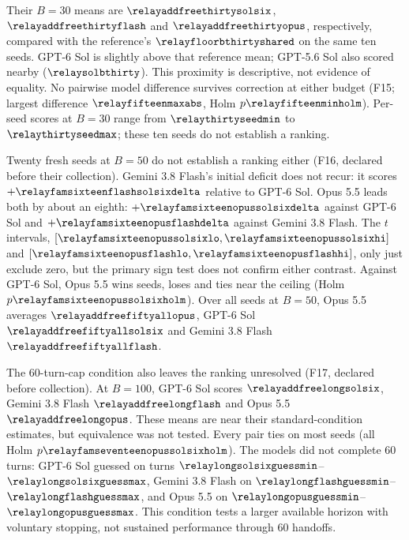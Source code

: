 Their $B{=}30$ means are $\relayaddfreethirtysolsix$, $\relayaddfreethirtyflash$ and $\relayaddfreethirtyopus$, respectively, compared with the reference's $\relayfloorbthirtyshared$ on the same ten seeds. GPT-6 Sol is slightly above that reference mean; GPT-5.6 Sol also scored nearby ($\relaysolbthirty$). This proximity is descriptive, not evidence of equality. No pairwise model difference survives correction at either budget (F15; largest difference $\relayfifteenmaxabs$, Holm $p\relayfifteenminholm$). Per-seed scores at $B{=}30$ range from $\relaythirtyseedmin$ to $\relaythirtyseedmax$; these ten seeds do not establish a ranking.

Twenty fresh seeds at $B{=}50$ do not establish a ranking either (F16, declared before their collection). Gemini 3.8 Flash's initial deficit does not recur: it scores $+\relayfamsixteenflashsolsixdelta$ relative to GPT-6 Sol. Opus 5.5 leads both by about an eighth: $+\relayfamsixteenopussolsixdelta$ against GPT-6 Sol and $+\relayfamsixteenopusflashdelta$ against Gemini 3.8 Flash. The $t$ intervals, $[\relayfamsixteenopussolsixlo, \relayfamsixteenopussolsixhi]$ and $[\relayfamsixteenopusflashlo, \relayfamsixteenopusflashhi]$, only just exclude zero, but the primary sign test does not confirm either contrast. Against GPT-6 Sol, Opus 5.5 wins \relayfamsixteenopussolsixpos{} seeds, loses \relayfamsixteenopussolsixneg{} and ties \relayfamsixteenopussolsixties{} near the ceiling (Holm $p\relayfamsixteenopussolsixholm$). Over all \relayaddfreefiftyallnopus{} seeds at $B{=}50$, Opus 5.5 averages $\relayaddfreefiftyallopus$, GPT-6 Sol $\relayaddfreefiftyallsolsix$ and Gemini 3.8 Flash $\relayaddfreefiftyallflash$.

The 60-turn-cap condition also leaves the ranking unresolved (F17, declared before collection). At $B{=}100$, GPT-6 Sol scores $\relayaddfreelongsolsix$, Gemini 3.8 Flash $\relayaddfreelongflash$ and Opus 5.5 $\relayaddfreelongopus$. These means are near their standard-condition estimates, but equivalence was not tested. Every pair ties on most seeds (all Holm $p\relayfamseventeenopussolsixholm$). The models did not complete 60 turns: GPT-6 Sol guessed on turns $\relaylongsolsixguessmin$--$\relaylongsolsixguessmax$, Gemini 3.8 Flash on $\relaylongflashguessmin$--$\relaylongflashguessmax$, and Opus 5.5 on $\relaylongopusguessmin$--$\relaylongopusguessmax$. This condition tests a larger available horizon with voluntary stopping, not sustained performance through 60 handoffs.
